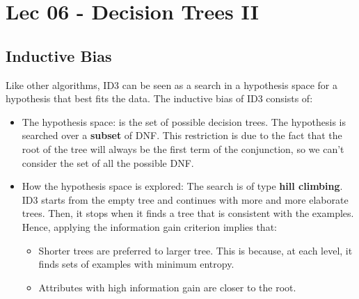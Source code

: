 \chapter{Lec 06 - Decision Trees II}

\section{Inductive Bias}
Like other algorithms, ID3 can be seen as a search in a hypothesis space for a hypothesis that best fits the data. The inductive bias of ID3 consists of:
\begin{itemize}
    \item The hypothesis space: is the set of possible decision trees. The hypothesis is searched over a \textbf{subset} of DNF. This restriction is due to the fact that the root of the tree will always be the first term of the conjunction, so we can't consider the set of all the possible DNF.

    \item How the hypothesis space is explored: The search is of type \textbf{hill climbing}. ID3 starts from the empty tree and continues with more and more elaborate trees. Then, it stops when it finds a tree that is consistent with the examples. Hence, applying the information gain criterion implies that:
    \begin{itemize}
        \item Shorter trees are preferred to larger tree. This is because, at each level, it finds sets of examples with minimum entropy.
        \item Attributes with high information gain are closer to the root. 
    \end{itemize}
\end{itemize}
